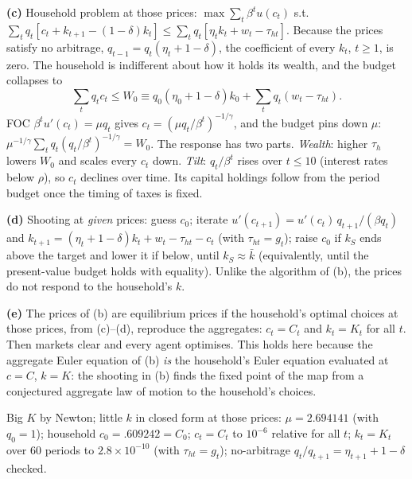\documentclass[12pt, letterpaper]{article}
\newcommand{\kb}{\bar k}
\begin{document}
\begin{tcolorbox}[oddbox,title={Exercise 11.19 \quad The invisible hand, I}]
\textbf{(c)} Household problem at those prices: $\max\sum_t\beta^tu(c_t)$ s.t.
$\sum_tq_t[c_t+k_{t+1}-(1-\delta)k_t]\le\sum_tq_t[\eta_tk_t+w_t-\tau_{ht}]$. Because the prices satisfy no arbitrage,
$q_{t-1}=q_t(\eta_t+1-\delta)$, the coefficient of every $k_t$, $t\ge1$, is zero. The household is indifferent about how it
holds its wealth, and the budget collapses to
\[
\sum_tq_tc_t\le W_0\equiv q_0(\eta_0+1-\delta)k_0+\sum_tq_t(w_t-\tau_{ht}).
\]
FOC $\beta^tu'(c_t)=\mu q_t$ gives $c_t=(\mu q_t/\beta^t)^{-1/\gamma}$, and the budget pins down $\mu$:
$\mu^{-1/\gamma}\sum_tq_t(q_t/\beta^t)^{-1/\gamma}=W_0$. The response has two parts. \emph{Wealth}: higher $\tau_h$ lowers
$W_0$ and scales every $c_t$ down. \emph{Tilt}: $q_t/\beta^t$ rises over $t\le10$ (interest rates below $\rho$), so $c_t$
declines over time. Its capital holdings follow from the period budget once the timing of taxes is fixed.

\textbf{(d)} Shooting at \emph{given} prices: guess $c_0$; iterate $u'(c_{t+1})=u'(c_t)\,q_{t+1}/(\beta q_t)$ and
$k_{t+1}=(\eta_t+1-\delta)k_t+w_t-\tau_{ht}-c_t$ (with $\tau_{ht}=g_t$); raise $c_0$ if $k_S$ ends above the target and lower
it if below, until $k_S\approx\kb$ (equivalently, until the present-value budget holds with equality). Unlike the
algorithm of (b), the prices do not respond to the household's $k$.

\textbf{(e)} The prices of (b) are equilibrium prices if the household's optimal choices at those prices, from (c)--(d),
reproduce the aggregates: $c_t=C_t$ and $k_t=K_t$ for all $t$. Then markets clear and every agent optimises. This holds
here because the aggregate Euler equation of (b) \emph{is} the household's Euler equation evaluated at $c=C$, $k=K$:
the shooting in (b) finds the fixed point of the map from a conjectured aggregate law of motion to the household's
choices.

\begin{tcolorbox}[databox]
Big $K$ by Newton; little $k$ in closed form at those prices: $\mu=2.694141$ (with $q_0=1$); household $c_0=.609242=C_0$;
$c_t=C_t$ to $10^{-6}$ relative for all $t$; $k_t=K_t$ over 60 periods to $2.8\times10^{-10}$ (with $\tau_{ht}=g_t$);
no-arbitrage $q_t/q_{t+1}=\eta_{t+1}+1-\delta$ checked.
\end{tcolorbox}
\end{tcolorbox}
\end{document}
